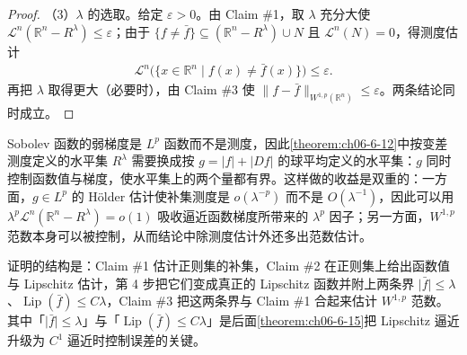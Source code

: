 \documentclass[../../main.tex]{subfiles}%
\begin{document}
\begin{proof}
（3）$\lambda$ 的选取。给定 $\varepsilon>0$。由 Claim \#1，取 $\lambda$ 充分大使 $\mathcal{L}^n(\mathbb{R}^n-R^\lambda)\le\varepsilon$；由于 $\{f\ne\bar f\}\subseteq(\mathbb{R}^n-R^\lambda)\cup N$ 且 $\mathcal{L}^n(N)=0$，得测度估计
\begin{align*}
\mathcal{L}^n\bigl(\{x\in\mathbb{R}^n\mid f(x)\ne\bar f(x)\}\bigr)\le\varepsilon .
\end{align*}
再把 $\lambda$ 取得更大（必要时），由 Claim \#3 使 $\lVert f-\bar f\rVert_{W^{1,p}(\mathbb{R}^n)}\le\varepsilon$。两条结论同时成立。%
\end{proof}

\begin{remark}\label{remark:ch06-thm-6-14-动机}
Sobolev 函数的弱梯度是 $L^p$ 函数而不是测度，因此\cref{theorem:ch06-6-12}中按变差测度定义的水平集 $R^\lambda$ 需要换成按 $g=\lvert f\rvert+\lvert Df\rvert$ 的球平均定义的水平集：$g$ 同时控制函数值与梯度，使水平集上的两个量都有界。这样做的收益是双重的：一方面，$g\in L^p$ 的 Hölder 估计使补集测度是 $o(\lambda^{-p})$ 而不是 $O(\lambda^{-1})$，因此可以用 $\lambda^p\mathcal{L}^n(\mathbb{R}^n-R^\lambda)=o(1)$ 吸收逼近函数梯度所带来的 $\lambda^p$ 因子；另一方面，$W^{1,p}$ 范数本身可以被控制，从而结论中除测度估计外还多出范数估计。%

证明的结构是：Claim \#1 估计正则集的补集，Claim \#2 在正则集上给出函数值与 Lipschitz 估计，第 4 步把它们变成真正的 Lipschitz 函数并附上两条界 $\lvert\bar f\rvert\le\lambda$、$\operatorname{Lip}(\bar f)\le C\lambda$，Claim \#3 把这两条界与 Claim \#1 合起来估计 $W^{1,p}$ 范数。其中「$\lvert\bar f\rvert\le\lambda$」与「$\operatorname{Lip}(\bar f)\le C\lambda$」是后面\cref{theorem:ch06-6-15}把 Lipschitz 逼近升级为 $C^1$ 逼近时控制误差的关键。%
\end{remark}
\end{document}
